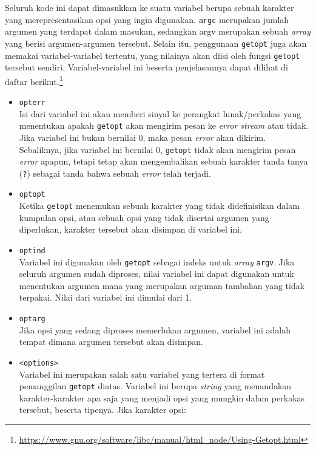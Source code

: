 \documentclass[a4paper,twoside]{article}
\begin{document}
\begin{enumerate}
Seluruh kode ini dapat dimasukkan ke suatu variabel berupa sebuah karakter yang merepresentasikan opsi yang ingin digunakan. \verb|argc| merupakan jumlah argumen yang terdapat dalam masukan, \linebreak sedangkan argv merupakan sebuah \textit{array} yang berisi argumen-argumen tersebut.
\newline\newline
Selain itu, penggunaan \verb|getopt| juga akan memakai variabel-variabel tertentu, yang nilainya akan diisi oleh fungsi \verb|getopt| tersebut sendiri. Variabel-variabel ini beserta penjelasannya dapat dilihat di daftar berikut.\footnote{\href{https://www.gnu.org/software/libc/manual/html\_node/Using-Getopt.html}{https://www.gnu.org/software/libc/manual/html\_node/Using-Getopt.html}}
\begin{itemize}
	\item \verb|opterr|\\
	Isi dari variabel ini akan memberi sinyal ke perangkat lunak/perkakas yang menentukan apakah \verb|getopt| akan mengirim pesan ke \textit{error stream} atau tidak. Jika variabel ini bukan bernilai 0, maka pesan \textit{error} akan dikirim. Sebaliknya, jika variabel ini bernilai 0, \verb|getopt| tidak akan mengirim pesan \textit{error} apapun, tetapi tetap akan mengembalikan sebuah karakter tanda tanya (\verb|?|) sebagai tanda bahwa sebuah \textit{error} telah terjadi.
	\item \verb|optopt|\\
	Ketika \verb|getopt| menemukan sebuah karakter yang tidak didefinisikan dalam kumpulan opsi, atau sebuah opsi yang tidak disertai argumen yang diperlukan, karakter tersebut akan disimpan di variabel ini.
	\item \verb|optind|\\
	Variabel ini digunakan oleh \verb|getopt| sebagai indeks untuk \textit{array} \verb|argv|. Jika seluruh argumen sudah diproses, nilai variabel ini dapat digunakan untuk menentukan argumen mana yang merupakan arguman tambahan yang tidak terpakai. Nilai dari variabel ini dimulai dari 1.
	\item \verb|optarg|\\
	Jika opsi yang sedang diproses memerlukan argumen, variabel ini adalah tempat dimana argumen tersebut akan disimpan.
	\item \verb|<options>|\\
	Variabel ini merupakan salah satu variabel yang tertera di format pemanggilan \verb|getopt| diatas. Variabel ini berupa \textit{string} yang menandakan karakter-karakter apa saja yang menjadi opsi yang mungkin dalam perkakas tersebut, beserta tipenya. Jika karakter opsi:
	

\end{itemize}
\end{enumerate}
\end{document}
